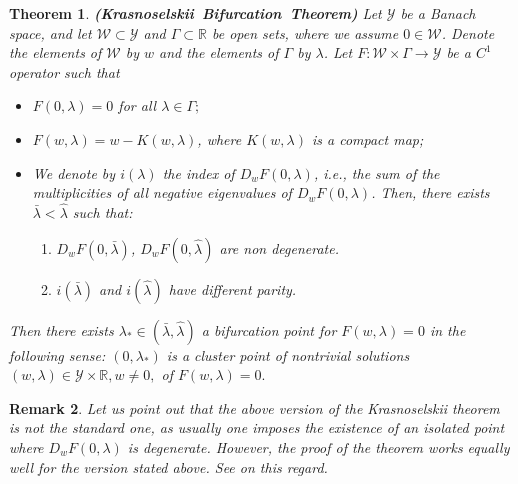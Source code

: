 \documentclass[reqno]{amsart}
\newtheorem{theorem}{Theorem}[section]
\newtheorem{remark}[theorem]{Remark}
\numberwithin{equation}{section}
\newenvironment{key words}{\textbf{Keywords}\mbox{  }}{ }
\begin{document}
\begin{theorem} \label{Th401} \textbf{\mbox{(Krasnoselskii Bifurcation Theorem)}}
Let $\mathcal{Y}$ be a Banach space, and let $\mathcal{W}\subset \mathcal{Y}$ and $\Gamma\subset\mathbb{R}$ be open sets, where we assume $0\in\mathcal{W}$. Denote the elements of $\mathcal{W}$ by $w$ and the elements of $\Gamma$ by $\lambda$. Let $F:\mathcal{W}\times\Gamma\rightarrow \mathcal{Y}$ be a $C^{1}$ operator such that
\begin{itemize}
  \item[i)] $F(0,\lambda)=0$ for all $\lambda\in\Gamma;$
  \item[ii)] $F(w,\lambda)=w-K(w,\lambda)$, where $K(w,\lambda)$ is a compact map;
  \item[iii)] We denote by $i(\lambda) $ the index of $D_{w}F(0,\lambda)$, i.e., the sum of the multiplicities of all negative eigenvalues of $D_{w}F(0,\lambda)$. Then, there exists $\bar{\lambda} <\hat{\lambda}$ such that:
  \begin{enumerate}
  	\item $D_{w}F(0,\bar{\lambda})$, $D_{w}F(0,\hat{\lambda})$ are non degenerate.
  	\item $i(\bar{\lambda})$ and $i(\hat{\lambda})$ have different parity.
  \end{enumerate}

\end{itemize}
Then there exists $\lambda_{*} \in (\bar{\lambda}, \hat{\lambda})$ a bifurcation point for $F(w,\lambda)=0$ in the following sense: $(0,\lambda_{*})$ is a cluster point of nontrivial solutions $(w,\lambda)\in \mathcal{Y}\times\mathbb{R},w\neq0,$ of $F(w,\lambda)=0.$
  \end{theorem}

\begin{remark} Let us point out that the above version of the Krasnoselskii theorem is not the standard one, as usually one imposes the existence of an isolated point where $D_wF(0, \lambda)$ is degenerate. However, the proof of the theorem works equally well for the version stated above. See \cite[Remark 6.3]{RRS20} on this regard.
\end{remark}
\end{document}
